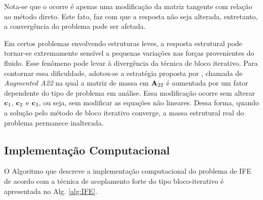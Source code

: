 \documentclass[tese_patricia]{subfiles}
\begin{document}
Nota-se que o ocorre é apenas uma modificação da matriz tangente com relação ao método direto. Este fato, faz com que a resposta não seja alterada, entretanto, a convergência do problema pode ser afetada. 

Em certos problemas envolvendo estruturas leves, a resposta estrutural pode tornar-se extremamente sensível a pequenas variações nas forças provenientes do fluido. Esse fenômeno pode levar à divergência da técnica de bloco iterativo. Para contornar essa dificuldade, adotou-se a estratégia proposta por , chamada de \textit{Augmented A22} na qual a matriz de massa em $\mathbf{A}_{22}$ é aumentada por um fator dependente do tipo de problema em análise. Essa modificação ocorre sem alterar $\mathbf{c}_{1}$, $\mathbf{c}_{2}$ e $\mathbf{c}_{3}$, ou seja, sem modificar as equações não lineares. Dessa forma, quando a solução pelo método de bloco iterativo converge, a massa estrutural real do problema permanece inalterada.

\subsection{Implementação Computacional} 


O Algoritmo que descreve a implementação computacional do problema de IFE de acordo com a técnica de acoplamento forte do tipo bloco-iterativo é apresentada no Alg. \ref{alg:IFE}.
\end{document}
